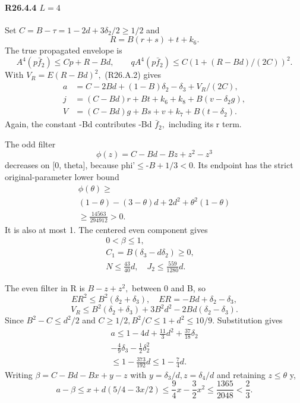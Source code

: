 \paragraph{R26.4.4 \(L=4\)}

Set \(C=B-\tau=1-2d+3\delta_2/2\ge 1/2\) and
\[
R=B(r+s)+t+k_6.
\]
The true propagated envelope is
\[
A^4(p\bar f_2)\le Cp+R-Bd,\qquad
qA^4(p\bar f_2)\le C(1+(R-Bd)/(2C))^2.
\]
With \(V_R=E(R-Bd)^2,\allowbreak \) (R26.A.2) gives
\[
\begin{aligned}
a&=C-2Bd+(1-B)\delta_2-\delta_3+V_R/(2C),\\
j&=(C-Bd)r+Bt+k_6+k_8+B(v-\delta_2g),\\
V&=(C-Bd)g+Bs+v+k_7+B(t-\delta_2).
\end{aligned}                                                        \tag{R26.A.16}
\]
Again, the constant -Bd contributes -Bd \(\bar f_2,\allowbreak \) including its r term.

The odd filter
\[
\phi(z)=C-Bd-Bz+z^2-z^3
\]
decreases on [0, theta], because phi'\ensuremath{\le}-\(B+1/3<0.\) Its endpoint has the
strict original-parameter lower bound
\[
\begin{gathered}
\phi(\theta)\ge\\
(1-\theta)-(3-\theta)d+2d^2+\theta^2(1-\theta)\\
\ge\frac{14563}{294912}>0.
\end{gathered}
\]
It is also at most 1. The centered even component gives
\[
\begin{gathered}
0<\beta\le1,\quad\\
C_1=B(\delta_3-d\delta_2)\ge0,\quad\\
N\le\frac{43}{40}d,\quad J_2\le\frac{559}{1280}d.
\end{gathered}
\]

The even filter in R is \(B-z+z^2,\allowbreak \) between 0 and B, so
\[
ER^2\le B^2(\delta_2+\delta_3),\quad ER=-Bd+\delta_2-\delta_3,
\]
\[
V_R\le B^2(\delta_2+\delta_3)+3B^2d^2-2Bd(\delta_2-\delta_3).
\]
Since \(B^2-C\le d^2/2\) and \(C\ge 1/2,\allowbreak  B^2/C\le 1+d^2\le 10/9.\) Substitution gives
\[
\begin{gathered}
a\le1-4d+\frac{11}{3}d^2+\frac{37}{18}\delta_2\\
-\frac49\delta_3-\frac12\delta_2^2\\
\le1-\frac{373}{192}d\le1-\frac74d.
\end{gathered}
\]
Writing \(\beta=C-Bd-Bx+y-z\) with \(y=\delta_3/d,\allowbreak  z=\delta_4/d\) and retaining \(z\le \theta\) y,
\[
a-\beta\le x+d(5/4-3x/2)
\le\frac94x-\frac32x^2
\le\frac{1365}{2048}<\frac23.
\]

